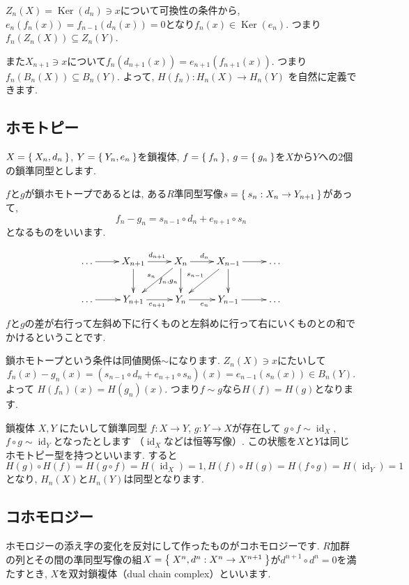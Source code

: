 \documentclass{jsarticle}
\newcommand{\makeop}[1]{\mathop{\mathrm{#1}}\nolimits}
\def\Ker{\makeop{Ker}}
\def\id{\makeop{id}}
\theoremstyle{definition}
\numberwithin{theorem}{section}
\begin{document}
$Z_n(X) = \Ker(d_n)\ni x$について可換性の条件から, $e_n(f_n(x)) = f_{n-1}(d_n(x)) = 0$となり$f_n(x) \in \Ker(e_n)$. つまり
$f_n(Z_n(X))\subseteq Z_n(Y)$.

また$X_{n+1}\ni x$について$f_n(d_{n+1}(x)) = e_{n+1}(f_{n+1}(x))$. つまり$f_n(B_n(X))\subseteq B_n(Y)$. よって,
$H(f_n): H_n(X) \rightarrow H_n(Y)$ を自然に定義できます.

\subsection{ホモトピー}
\label{sc:homotopy}
$X=\Set{X_n, d_n}$, $Y = \Set{Y_n, e_n}$を鎖複体, $f=\Set{f_n}$, $g=\Set{g_n}$を$X$から$Y$への2個の鎖準同型とします.

$f$と$g$が鎖ホモトープであるとは, ある$R$準同型写像$s=\Set{s_n: X_n\rightarrow Y_{n+1}}$があって,
\[
f_n-g_n = s_{n-1} \circ d_n+e_{n+1} \circ s_n
\]
となるものをいいます.

\begin{equation*}
\xymatrix{
  \ldots \ar[r] & X_{n+1} \ar[r]^{d_{n+1}} \ar[d] & X_{n} \ar[r]^{d_n} \ar[d]_{f_n,g_n} \ar[dl]_{s_n} & X_{n-1} \ar[r] \ar[dl]_{s_{n-1}} \ar[d] & \ldots\\
  \ldots \ar[r] & Y_{n+1} \ar[r]_{e_{n+1}} & Y_{n} \ar[r]_{e_n} & Y_{n-1} \ar[r] & \ldots\\
}
\end{equation*}
$f$と$g$の差が右行って左斜め下に行くものと左斜めに行って右にいくものとの和でかけるということです.

鎖ホモトープという条件は同値関係$\sim$になります.
$Z_n(X) \ni x$にたいして
\[
f_n(x) - g_n(x) = (s_{n-1} \circ d_n + e_{n+1}\circ s_n)(x) = e_{n-1}(s_n(x)) \in B_n(Y).
\]
よって $H(f_n)(x) = H(g_n)(x)$. つまり$f\sim g$なら$H(f) = H(g)$となります.

鎖複体 $X, Y$ にたいして鎖準同型 $f: X\rightarrow Y$, $g: Y\rightarrow X$が存在して $g\circ f \sim \id_X$, $f\circ g \sim \id_Y$となったとします
（$\id_X$などは恒等写像）. この状態を$X$と$Y$は同じホモトピー型を持つといいます. すると
\[
H(g)\circ H(f) = H(g\circ f) = H(\id_X) = 1, H(f)\circ H(g) = H(f\circ g) = H(\id_Y) = 1
\]
となり,  $H_n(X)$と$H_n(Y)$は同型となります.

\subsection{コホモロジー}
ホモロジーの添え字の変化を反対にして作ったものがコホモロジーです.
$R$加群の列とその間の準同型写像の組$X = \Set{X^n, d^n:X^n \rightarrow X^{n+1}}$が$d^{n+1} \circ d^n = 0$を満たすとき, $X$を双対鎖複体（dual chain complex）といいます.
\end{document}
